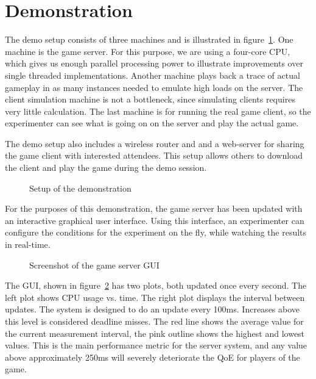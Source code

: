 \section{Demonstration}\label{sec:demo}

The demo setup consists of three machines and is illustrated in
figure~\ref{fig:demo-setup}. One machine is the game server. For this
purpose, we are using a four-core CPU, which gives us enough parallel
processing power to illustrate improvements over single threaded
implementations. Another machine plays back a trace of actual gameplay
in as many instances needed to emulate high loads on the server. The
client simulation machine is not a bottleneck, since simulating
clients requires very little calculation. The last machine is for
running the real game client, so the experimenter can see what is
going on on the server and play the actual game.

The demo setup also includes a wireless router and and a web-server
for sharing the game client with interested attendees. This setup
allows others to download the client and play the game during the demo
session.

\begin{figure}
\centering
{}
\vspace{-1mm}
\caption{Setup of the demonstration}
\vspace{-2.5mm}
\label{fig:demo-setup}
\vspace{-2.5mm}
\end{figure}

For the purposes of this demonstration, the game server has been
updated with an interactive graphical user interface. Using this
interface, an experimenter can configure the conditions for the
experiment on the fly, while watching the results in real-time.

\begin{figure}
\centering
{}
\vspace{-3mm}
\caption{Screenshot of the game server GUI}
\vspace{-2.5mm}
\label{fig:gui}
\vspace{-2.5mm}
\end{figure}

The GUI, shown in figure~\ref{fig:gui} has two plots, both updated
once every second. The left plot shows CPU usage vs. time. The right plot displays the interval between
updates. The system is designed to do an update every 100ms. Increases
above this level is considered deadline misses. The red line shows the
average value for the current measurement interval, the pink outline
shows the highest and lowest values. This is the main performance
metric for the server system, and any value above approximately 250ms
will severely deteriorate the QoE for players of the game.


